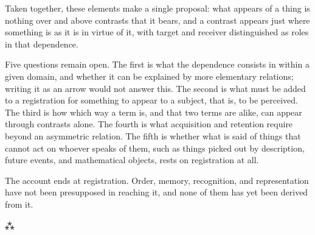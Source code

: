 \documentclass[11pt,a4paper,oneside]{scrartcl}
\begin{document}
Taken together, these elements make a single proposal: what appears of a thing is nothing over and
above contrasts that it bears, and a contrast appears just where something is as it is in virtue
of it, with target and receiver distinguished as roles in that dependence.

Five questions remain open. The first is what the dependence consists in within a given domain,
and whether it can be explained by more elementary relations; writing it as an arrow would not
answer this. The second is what must be added to a registration for something to appear to a
subject, that is, to be perceived. The third is how which way a term is, and that two terms are
alike, can appear through contrasts alone. The fourth is what acquisition and retention require
beyond an asymmetric relation. The fifth is whether what is said of things that cannot act on
whoever speaks of them, such as things picked out by description, future events, and mathematical
objects, rests on registration at all.

The account ends at registration. Order, memory, recognition, and representation have not been
presupposed in reaching it, and none of them has yet been derived from it.

\begin{center}
  \vspace{1.2\baselineskip}
  {\large ⁂}
\end{center}

\printbibliography[heading=bibintoc,title={References}]
\end{document}
